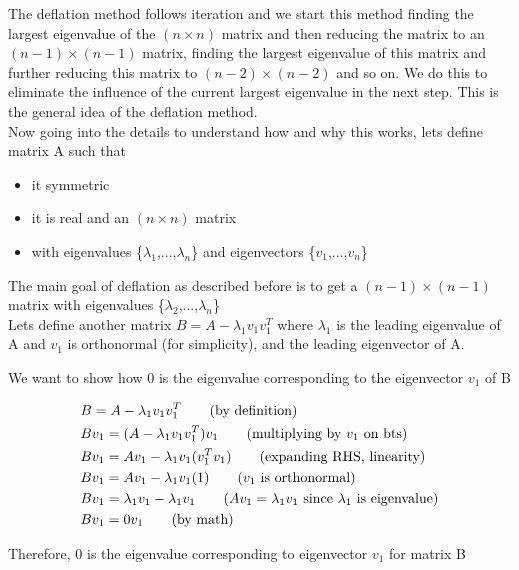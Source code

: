 \documentclass[11pt]{article}
\begin{document}
The  deflation method follows iteration and we start this method finding the largest eigenvalue of the $(n \times n)$ matrix and then reducing the matrix  to an $(n-1) \times (n-1)$ matrix, finding the largest eigenvalue of this matrix and further reducing this matrix to $(n-2) \times (n-2)$ and so on. We do this to eliminate the influence of the current largest eigenvalue in the next step. This is the general idea of the deflation method.\\

Now going into the details to understand how and why this works, lets define matrix A such that 
\begin{itemize}
    \item it symmetric
    \item it is real and an $(n \times n)$ matrix
    \item with eigenvalues \{$\lambda_{1}$,...,$\lambda_{n}$\} and eigenvectors \{$v_{1}$,...,$v_{n}$\}
\end{itemize}

The main goal of deflation as described before is to get a $(n-1) \times (n-1)$ matrix with eigenvalues \{$\lambda_{2}$,...,$\lambda_{n}$\}\\

Lets define another matrix $B = A - \lambda_{1}v_{1}v_{1}^{T}$ where $\lambda_{1}$ is the leading eigenvalue of A and $v_{1}$ is orthonormal (for simplicity), and the leading eigenvector of A. 

We want to show how 0 is the eigenvalue corresponding to the eigenvector $v_{1}$ of B

\begin{align*}
    & B = A - \lambda_{1}v_{1}v_{1}^{T} \tag{by definition}\\
    & Bv_{1} = (A - \lambda_{1}v_{1}v_{1}^{T})v_{1} \tag{multiplying by $v_{1}$ on bts}\\
    & Bv_{1} = Av_{1} - \lambda_{1}v_{1}(v_{1}^{T}v_{1}) \tag{expanding RHS, linearity}\\
   & Bv_{1} = Av_{1} - \lambda_{1}v_{1}(1) \tag{$v_{1}$ is orthonormal}\\
   & Bv_{1} = \lambda_{1}v_{1} - \lambda_{1}v_{1} \tag{$Av_{1} = \lambda_{1}v_{1}$ since $\lambda_{1}$ is eigenvalue}\\
    & Bv_{1} = 0v_{1} \tag{by math}\\
\end{align*}

Therefore, $0$ is the eigenvalue corresponding to eigenvector $v_{1}$ for matrix B\\
\end{document}
